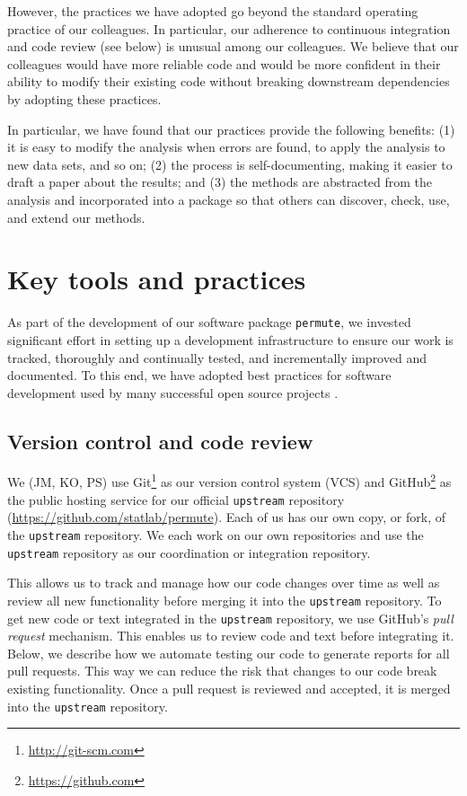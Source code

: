 \documentclass[]{article}
\begin{document}
However, the practices we have adopted go beyond the standard operating
practice of our colleagues.
In particular, our adherence to continuous integration and code review
(see below) is unusual among our colleagues.
We believe that our colleagues would have more reliable code and would be more
confident in their ability to modify their existing code without breaking
downstream dependencies by adopting these practices.

In particular, we have found that our practices provide the following benefits:
(1) it is easy to modify the analysis when errors are found, to apply the
    analysis to new data sets, and so on;
(2) the process is self-documenting, making it easier to draft a paper about
    the results; and
(3) the methods are abstracted from the analysis and incorporated into a
    package so that others can discover, check, use, and extend our methods.

\section{Key tools and practices}\label{key-tools}

As part of the development of our software package \texttt{permute}, we
invested significant effort in setting up a development infrastructure to
ensure our work is tracked, thoroughly and continually tested, and
incrementally improved and documented.
To this end, we have adopted best practices for software development used by
many successful open source projects \citep{millman2014developing}.

\subsection{\label{sec:vc}Version control and code review}

We (JM, KO, PS) use Git\footnote{\url{http://git-scm.com}} as our version
control system (VCS) and GitHub\footnote{\url{https://github.com}} as the
public hosting service for our official \texttt{upstream} repository
(\url{https://github.com/statlab/permute}).
Each of us has our own copy, or fork, of the \texttt{upstream} repository.
We each work on our own repositories and use the \texttt{upstream} repository
as our coordination or integration repository.

This allows us to track and manage how our code changes over time as well as
review all new functionality before merging it into the \texttt{upstream}
repository.
To get new code or text integrated in the \texttt{upstream} repository, we use
GitHub's \emph{pull request} mechanism.
This enables us to review code and text before integrating it.
Below, we describe how we automate testing our code to generate reports for all
pull requests.
This way we can reduce the risk that changes to our code break existing
functionality.
Once a pull request is reviewed and accepted, it is merged into the
\texttt{upstream} repository.
\end{document}
